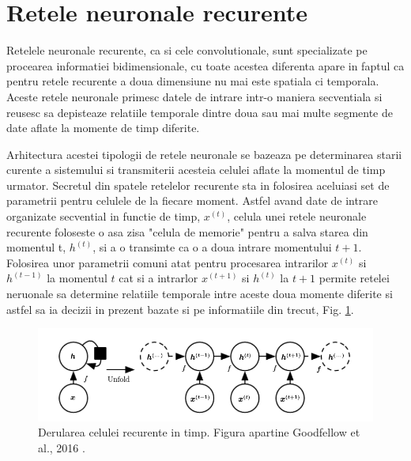 \documentclass[a4paper,12pt]{book}
\begin{document}
			\section{Retele neuronale recurente} \label{RNN}
				
				Retelele neuronale recurente, ca si cele convolutionale, sunt specializate pe procearea informatiei bidimensionale, cu toate acestea diferenta apare in faptul ca pentru retele recurente a doua dimensiune nu mai este spatiala ci temporala. Aceste retele neuronale primesc datele de intrare intr-o maniera secventiala si reusesc sa depisteaze relatiile temporale dintre doua sau mai multe segmente de date aflate la momente de timp diferite. \par
				
				Arhitectura acestei tipologii de retele neuronale se bazeaza pe determinarea starii curente a sistemului si transmiterii acesteia celulei aflate la momentul de timp urmator. Secretul din spatele retelelor recurente sta in folosirea aceluiasi set de parametrii pentru celulele de la fiecare moment. Astfel avand date de intrare organizate secvential in functie de timp, $x^{(t)}$, celula unei retele neuronale recurente foloseste o asa zisa "celula de memorie" pentru a salva starea din momentul t, $h^{(t)}$, si a o transimte ca o a doua intrare momentului $t+1$. Folosirea unor parametrii comuni atat pentru procesarea intrarilor $x^{(t)}$ si $h^{(t-1)}$ la momentul $t$ cat si a intrarlor $x^{(t+1)}$ si $h^{(t)}$ la $t+1$ permite retelei neruonale sa determine relatiile temporale intre aceste doua momente diferite si astfel sa ia decizii in prezent bazate si pe informatiile din trecut, Fig. \ref{fig:unfolding}. 
				
				\begin{figure}[h]
					\centering
					\includegraphics[scale=0.45]{unfolding}
					\caption{Derularea celulei recurente in timp. Figura apartine Goodfellow et al., 2016 \cite{dpb}.}
					\label{fig:unfolding}
				\end{figure}
				
\end{document}
